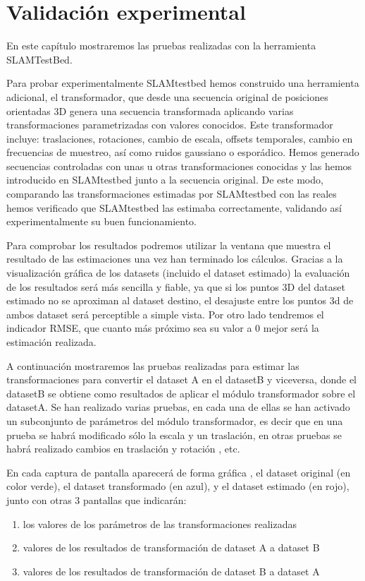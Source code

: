 \newpage
\chapter{Validación experimental} \label{cap:experimentos}
En este capítulo mostraremos las pruebas realizadas con la herramienta SLAMTestBed.

Para probar experimentalmente SLAMtestbed hemos construido una herramienta adicional, el transformador, que desde una secuencia original de posiciones orientadas 3D genera una secuencia transformada aplicando varias transformaciones parametrizadas con valores conocidos. Este transformador incluye: traslaciones, rotaciones, cambio de escala, offsets temporales, cambio en frecuencias de muestreo, así como ruidos gaussiano o esporádico.
Hemos generado secuencias controladas con unas u otras transformaciones conocidas y las hemos introducido en SLAMtestbed junto a la secuencia original. De este modo, comparando las transformaciones estimadas por SLAMtestbed con las reales hemos verificado que SLAMtestbed las estimaba correctamente, validando así experimentalmente su buen funcionamiento.

Para comprobar los resultados podremos utilizar la ventana que muestra el resultado de las estimaciones una vez han terminado los cálculos. Gracias a la visualización gráfica de los datasets (incluido el dataset estimado) la evaluación de los resultados será más sencilla y fiable, ya que si los puntos 3D del dataset estimado no se aproximan al dataset destino, el desajuste entre los puntos 3d de ambos dataset será perceptible a simple vista. 
Por otro lado tendremos el indicador RMSE, que cuanto más próximo sea su valor a 0 mejor será la estimación realizada.

A continuación mostraremos las pruebas realizadas para estimar las transformaciones para convertir el dataset A en el datasetB y viceversa, donde el datasetB se obtiene como resultados de aplicar el módulo transformador sobre el datasetA.
Se han realizado varias pruebas, en cada una de ellas se han activado un subconjunto de parámetros del módulo transformador, es decir que en una prueba se habrá modificado sólo la escala y un traslación, en otras pruebas se habrá realizado cambios en traslación y rotación , etc.

En cada captura de pantalla aparecerá de forma gráfica , el dataset original (en color verde), el dataset transformado (en azul), y el dataset estimado (en rojo), junto con otras 3 pantallas que indicarán:
\begin{enumerate}
 \item{los valores de los parámetros de las transformaciones realizadas} 
 \item{valores de los resultados de transformación de dataset A a dataset B}
 \item{valores de los resultados de transformación de dataset B a dataset A}
\end{enumerate}

